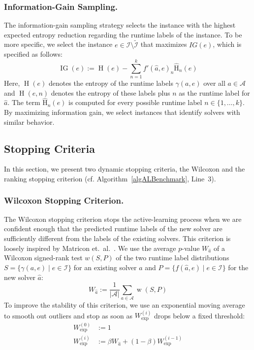 \documentclass[runningheads]{llncs}
\begin{document}
\subsubsection{Information-Gain Sampling.}

The information-gain sampling strategy selects the instance with the highest expected entropy reduction regarding the runtime labels of the instance.
To be more specific, we select the instance $e \in \mathcal{I} \setminus \tilde{\mathcal{I}}$ that maximizes $IG(e)$, which is specified as follows:
%
\begin{equation*}
  \operatorname{IG}(e) := \operatorname{H}(e) - \sum_{n = 1}^{k} f'(\hat{a}, e)_{n} \operatorname{\hat H}_n(e)
\end{equation*}
%
Here, $\operatorname{H}(e)$ denotes the entropy of the runtime labels $\gamma(a, e)$ over all $a \in \mathcal{A}$ and $\operatorname{H}(e, n)$ denotes the entropy of these labels plus $n$ as the runtime label for $\hat{a}$.
The term $\operatorname{\hat H}_n(e)$ is computed for every possible runtime label $n \in \{1, \dots, k\}$.
By maximizing information gain, we select instances that identify solvers with similar behavior.

\subsection{Stopping Criteria}
\label{sec:main:stopping}

In this section, we present two dynamic stopping criteria, the Wilcoxon and the ranking stopping criterion (cf. Algorithm~\ref{algALBenchmark}, Line~3).

\subsubsection{Wilcoxon Stopping Criterion.}

The Wilcoxon stopping criterion stops the active-learning process when we are confident enough that the predicted runtime labels of the new solver are sufficiently different from the labels of the existing solvers.
This criterion is loosely inspired by Matricon et.~al.~\cite{MatriconAFSH21}.
We use the average $p$-value $W_{\hat{a}}$ of a Wilcoxon signed-rank test $w(S,P)$ of the two runtime label distributions $S=\{ \gamma(a, e) \mid e \in \mathcal{I} \}$ for an existing solver $a$ and $P=\{ f(\hat a, e) \mid e \in \mathcal{I} \}$ for the new solver $\hat{a}$:
%
\begin{equation*}
  W_{\hat{a}} := \frac{1}{\lvert \mathcal{A} \rvert} \sum_{a \in \mathcal{A}} \operatorname{w}(S, P)
\end{equation*}
%
To improve the stability of this criterion, we use an exponential moving average to smooth out outliers and stop as soon as $W^{(i)}_{\exp}$ drops below a fixed threshold:
%
\begin{align*}
  W_{\exp}^{\left(0\right)} &:= 1\\
  W_{\exp}^{\left(i\right)} &:= \beta W_{\hat{a}} + \left(1 - \beta\right) W_{\exp}^{\left(i - 1\right)}
\end{align*}
\end{document}

